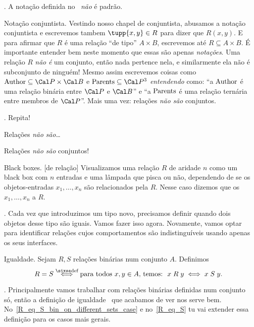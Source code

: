 \beware.
A notação definida no~
\emph{não} é padrão.

\note Notação conjuntista.
\label{setlike_notation_for_relations}%
Vestindo nosso chapel de conjuntista, abusamos a notação conjuntista e escrevemos
tambem $\tupp{x,y} \in R$ para dizer que $R(x,y)$.
E para afirmar que $R$ é uma relação ``de tipo'' $A\times B$, escrevemos
até $R \subseteq A\times B$.
É importante entender bem neste momento que essas são apenas
\emph{notações}.  Uma relação $R$ \emph{não é} um conjunto, então nada pertence nela,
e similarmente ela não é subconjunto de ninguém!
Mesmo assim escrevemos coisas como
$\namedpred{Author} \subseteq \cal P \times \cal B$
e
$\namedpred{Parents} \subseteq \cal P^3$
\emph{entendendo} como: ``a $\mathop{\rm Author}\nolimits$ é uma relação binária
entre $\cal P$ e $\cal B$'' e ``a $\mathop{\rm Parents}\nolimits$ é uma relação
ternária entre membros de $\cal P$''.
Mais uma vez: relações \emph{não são} conjuntos.

\exercise.
Repita!

\hint
Relações \emph{não são}\dots

\solution
Relações \emph{não são} conjuntos!

\endexercise

\note Black boxes.
\label{blackbox_rel}%
[de relação]%
%
Visualizamos uma relação $R$ de aridade $n$ como um black box com $n$ entradas
e uma lâmpada que pisca ou não, dependendo de se os objetos-entradas
$x_1,\dotsc,x_n$ são relacionados pela $R$.
Nesse caso dizemos que os $x_1,\dotsc,x_n$  a $R$.

\blah.
Cada vez que introduzimos um tipo novo, precisamos definir quando dois objetos
desse tipo são iguais.  Vamos fazer isso agora.  Novamente, vamos optar para
identificar relações cujos comportamentos são indistinguíveis usando apenas
os seus interfaces.

 Igualdade.
\label{R_eq_S_bin_on_single_set_case}%
Sejam $R,S$ relações binárias num conjunto $A$.
Definimos
$$
R=S
\defiff
\text {para todos $x,y \in A$, temos:\ \ $x \rel R y \iff x \rel S y$}.
$$

\blah.
Principalmente vamos trabalhar com relações binárias definidas num conjunto só,
então a definição de igualdade~ que
acabamos de ver nos serve bem.  No~\ref{R_eq_S_bin_on_different_sets_case}
e no~\ref{R_eq_S} tu vai extender essa definição para os casos mais gerais.

